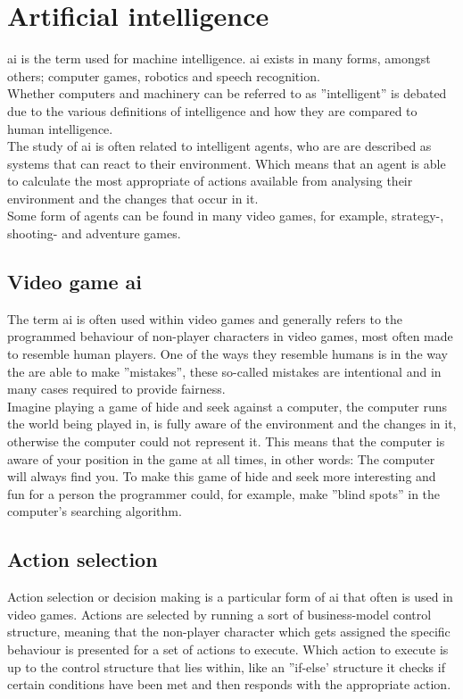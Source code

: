 \section{Artificial intelligence}
\ac{ai} is the term used for machine intelligence. \ac{ai} exists in many forms, amongst others; computer games, robotics and speech recognition.\\
Whether computers and machinery can be referred to as ''intelligent'' is debated due to the various definitions of intelligence and how they are compared to human intelligence.\\
The study of \ac{ai} is often related to intelligent agents, who are are described as systems that can react to their environment. Which means that an agent is able to calculate the most appropriate of actions available from analysing their environment and the changes that occur in it.\\
Some form of agents can be found in many video games, for example, strategy-, shooting- and adventure games.

\subsection{Video game \ac{ai}}
The term \ac{ai} is often used within video games and generally refers to the programmed behaviour of non-player characters in video games, most often made to resemble human players. One of the ways they resemble humans is in the way the are able to make ''mistakes'', these so-called mistakes are intentional and in many cases required to provide fairness.\\
Imagine playing a game of hide and seek against a computer, the computer runs the world being played in, is fully aware of the environment and the changes in it, otherwise the computer could not represent it. This means that the computer is aware of your position in the game at all times, in other words: The computer will always find you. To make this game of hide and seek more interesting and fun for a person the programmer could, for example, make ''blind spots'' in the computer's searching algorithm.\\

\subsection{Action selection}
Action selection or decision making is a particular form of \ac{ai} that often is used in video games. Actions are selected by running a sort of business-model control structure, meaning that the non-player character which gets assigned the specific behaviour is presented for a set of actions to execute. Which action to execute is up to the control structure that lies within, like an ''if-else' structure it checks if certain conditions have been met and then responds with the appropriate action.
